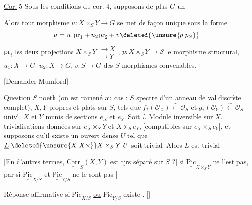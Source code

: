 \uline{Cor.} 5  Sous les conditions du cor. 4, supposons de plus $G$ un 

Alors tout morphisme $u:X\times_S Y\to G$ se met de façon unique sous la forme
\[
u=u_1\mathrm{pr}_1+u_2\mathrm{pr}_2+v\deleted{\unsure{p|p_S}}
\]
$\mathrm{pr}_i$ les deux projections $X\times_S Y\substack{\longrightarrow X\\\longrightarrow Y}$, $p:X\times_S Y\to S$ le morphisme structural, $u_1:X\to G$, $u_2:X\to G$, $v:S\to G$ des $S$-morphismes convenables.

[Demander Mumford]

\uline{Question} $S$ noeth (on est ramené au cas : $S$ spectre d'un anneau de val discrète  complet), $X,Y$ propres et plats sur $S$, tels que $f_*(\mathcal O_X)\xleftarrow{\sim}\mathcal O_S$ et $g_*(\mathcal O_Y)\xleftarrow{\sim}\mathcal O_S$ univ$^{\mathrm t}$. $X$ et $Y$ munis de sections $e_X$ et $e_Y$. Soit $\underline L$ Module inversible sur $X$,  trivialisations données sur $e_X\times_S Y$ et $X\times_S e_Y$, [compatibles sur $e_X\times_S e_Y$], et supposons qu'il existe un ouvert dense $U$ tel que $\underline L|\deleted{\unsure{X|X\times}}X\times_S Y|U$ soit trivial. Alors $\underline L$ est trivial

[En d'autres termes, $\underline{\underline{\mathrm{Corr}}}_S(X,Y)$ est tjrs \uline{séparé sur $S$} ?]  si  $\underline{\underline{\mathrm{Pic}}}_{X\times_S Y}$ ne l'est pas, par  si $\underline{\underline{\mathrm{Pic}}}_{X/S}$ et $\underline{\underline{\mathrm{Pic}}}_{Y/S}$ ne le sont pas ]

Réponse affirmative si $\underline{\mathrm{Pic}}_{X/S}$ \uline{ou} $\underline{\mathrm{Pic}}_{Y/S}$ existe . [] 

